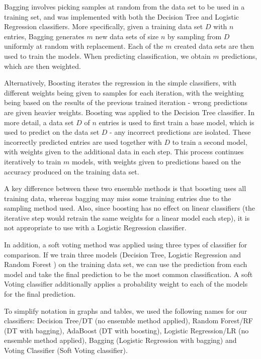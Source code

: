 \documentclass{article}
\begin{document}
Bagging \cite{bagging} involves picking samples at random from the data set to be used in a training set, and was implemented with both the Decision Tree and Logistic Regression classifiers.
More specifically, given a training data set $D$ with $n$ entries, Bagging generates $m$ new data sets of size $n$ by sampling from $D$ uniformly at random with replacement.
Each of the $m$ created data sets are then used to train the models.
When predicting classification, we obtain $m$ predictions, which are then weighted.

Alternatively, Boosting \cite{buhlmann2010boosting} iterates the regression in the simple classifiers, with different weights being given to samples for each iteration, with the weighting being based on the results of the previous trained iteration - wrong predictions are given heavier weights.
Boosting was applied to the Decision Tree classifier.
In more detail, a data set $D$ of $n$ entries is used to first train a base model, which is used to predict on the data set $D$ - any incorrect predictions are isolated.
These incorrectly predicted entries are used together with $D$ to train a second model, with weights given to the additional data in each step.
This process continues iteratively to train $m$ models, with weights given to predictions based on the accuracy produced on the training data set.

A key difference between these two ensemble methods is that boosting uses all training data, whereas bagging may miss some training entries due to the sampling method used.
Also, since boosting has no effect on linear classifiers (the iterative step would retrain the same weights for a linear model each step), it is not appropriate to use with a Logistic Regression classifier.

In addition, a soft voting method was applied using three types of classifier for comparison.
If we train three models (Decision Tree, Logistic Regression and Random Forest \cite{breiman2001random}) on the training data set, we can use the prediction from each model and take the final prediction to be the most common classification.
A soft Voting classifier additionally applies a probability weight to each of the models for the final prediction.

To simplify notation in graphs and tables, we used the following names for our classifiers: Decision Tree/DT (no ensemble method applied), Random Forest/RF (DT with bagging), AdaBoost (DT with boosting), Logistic Regression/LR (no ensemble method applied), Bagging (Logistic Regression with bagging) and Voting Classifier (Soft Voting classifier).
\end{document}
